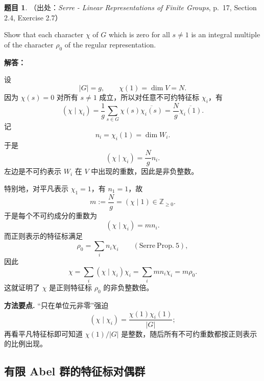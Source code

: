 \documentclass[a4paper]{ctexart}
\theoremstyle{definition}
\newtheorem{example}{题目}[section]
\theoremstyle{analysis}
\theoremstyle{plain}
\begin{document}
\begin{example}
（出处：\textit{Serre - Linear Representations of Finite Groups}, p.~17, Section 2.4, Exercise 2.7）

Show that each character \(\chi\) of \(G\) which is zero for all
\(s\ne 1\) is an integral multiple of the character \(\rho_0\) of the regular
representation.

\textbf{解答：}

设
\[
  |G|=g,
  \qquad
  \chi(1)=\dim V=N.
\]
因为 \(\chi(s)=0\) 对所有 \(s\ne 1\) 成立，所以对任意不可约特征标 \(\chi_i\)，有
\[
  (\chi\mid \chi_i)
  =
  \frac{1}{g}\sum_{s\in G}\chi(s)\overline{\chi_i(s)}
  =
  \frac{N}{g}\overline{\chi_i(1)}.
\]
记
\[
  n_i=\chi_i(1)=\dim W_i.
\]
于是
\[
  (\chi\mid \chi_i)=\frac{N}{g}n_i.
\]
左边是不可约表示 \(W_i\) 在 \(V\) 中出现的重数，因此是非负整数。

特别地，对平凡表示 \(\chi_1=1\)，有 \(n_1=1\)，故
\[
  m:=\frac{N}{g}=(\chi\mid 1)\in\mathbb Z_{\ge 0}.
\]
于是每个不可约成分的重数为
\[
  (\chi\mid \chi_i)=mn_i.
\]
而正则表示的特征标满足
\[
  \rho_0=\sum_i n_i\chi_i
  \qquad
  (\mathrm{Serre\ Prop.}\ 5),
\]
因此
\[
  \chi
  =
  \sum_i (\chi\mid \chi_i)\chi_i
  =
  \sum_i mn_i\chi_i
  =
  m\rho_0.
\]
这就证明了 \(\chi\) 是正则特征标 \(\rho_0\) 的非负整数倍。

\textbf{方法要点.}
“只在单位元非零”强迫
\[
  (\chi\mid\chi_i)=\frac{\chi(1)\chi_i(1)}{|G|};
\]
再看平凡特征标即可知道 \(\chi(1)/|G|\) 是整数，随后所有不可约重数都按正则表示的比例出现。
\end{example}

\subsection{有限 Abel 群的特征标对偶群}\label{subsec:problem-serre-abelian-dual-character}
\end{document}
